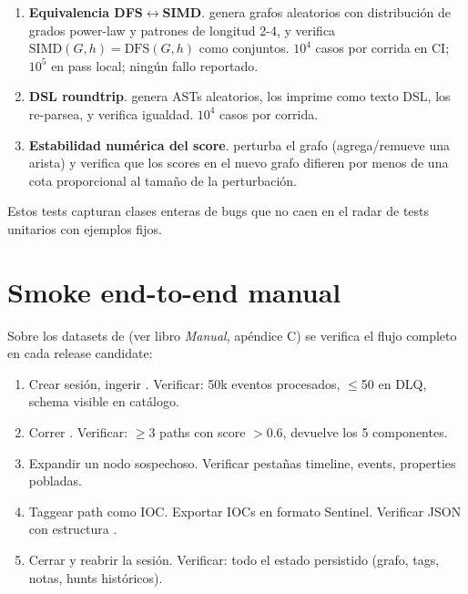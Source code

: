 \begin{enumerate}
    \item \textbf{Equivalencia DFS$\leftrightarrow$SIMD}.
    genera grafos aleatorios con distribución de grados power-law
    y patrones de longitud 2-4, y verifica
    $\text{SIMD}(G, h) = \text{DFS}(G, h)$ como conjuntos. $10^4$
    casos por corrida en CI; $10^5$ en pass local; ningún fallo
    reportado.
    \item \textbf{DSL roundtrip}.
     genera ASTs
    aleatorios, los imprime como texto DSL, los re-parsea, y
    verifica igualdad. $10^4$ casos por corrida.
    \item \textbf{Estabilidad numérica del score}.
     perturba
    el grafo (agrega/remueve una arista) y verifica que los
    scores en el nuevo grafo difieren por menos de una cota
    proporcional al tamaño de la perturbación.
\end{enumerate}

Estos tests capturan clases enteras de bugs que no caen en el
radar de tests unitarios con ejemplos fijos.

\section{Smoke end-to-end manual}

Sobre los datasets de
 (ver libro \emph{Manual}, apéndice C) se
verifica el flujo completo en cada release candidate:

\begin{enumerate}
    \item Crear sesión, ingerir
    . Verificar: 50k eventos
    procesados, $\le$50 en DLQ, schema visible en catálogo.
    \item Correr
    .
    Verificar: $\ge$3 paths con score $>$0.6,
     devuelve los 5 componentes.
    \item Expandir un nodo sospechoso. Verificar pestañas timeline,
    events, properties pobladas.
    \item Taggear path como IOC. Exportar IOCs en formato Sentinel.
    Verificar JSON con estructura .
    \item Cerrar y reabrir la sesión. Verificar: todo el estado
    persistido (grafo, tags, notas, hunts históricos).
\end{enumerate}

